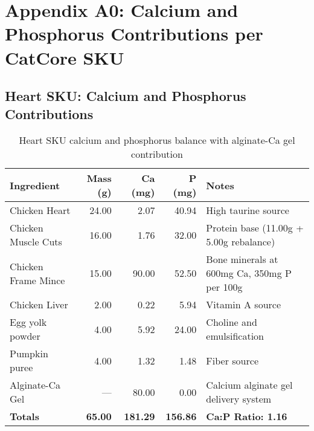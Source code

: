\newpage
\appendix  
\section*{Appendix A0: Calcium and Phosphorus Contributions per CatCore SKU}  

\subsection*{Heart SKU: Calcium and Phosphorus Contributions}  
\begin{table}[htbp]  
\centering  
\begin{tabular}{@{}l r r r p{7.0cm}@{}}  
\toprule  
Ingredient & Mass (g) & Ca (mg) & P (mg) & Notes \\  
\midrule  
Chicken Heart & 24.00 & 2.07 & 40.94 & High taurine source \\
Chicken Muscle Cuts & 16.00 & 1.76 & 32.00 & Protein base (11.00g + 5.00g rebalance) \\
Chicken Frame Mince & 15.00 & 90.00 & 52.50 & Bone minerals at 600mg Ca, 350mg P per 100g \cite{gopalakrishnan2019bonecomposition,usdaFDCbone2021}\\
Chicken Liver & 2.00 & 0.22 & 5.94 & Vitamin A source \\
Egg yolk powder & 4.00 & 5.92 & 24.00 & Choline and emulsification \\
Pumpkin puree & 4.00 & 1.32 & 1.48 & Fiber source \\
Alginate-Ca Gel & --- & 80.00 & 0.00 & Calcium alginate gel delivery system \\
\midrule
\textbf{Totals} & \textbf{65.00} & \textbf{181.29} & \textbf{156.86} & \textbf{Ca:P Ratio: 1.16} \\
\bottomrule  
\end{tabular}  
\caption*{Heart SKU calcium and phosphorus balance with alginate-Ca gel contribution}  
\end{table}  

\vspace{1em}  

